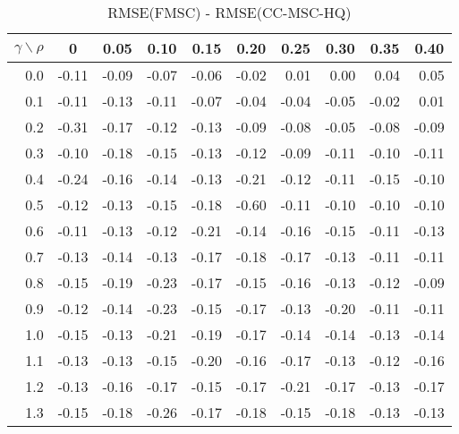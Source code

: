 \documentclass[12pt]{article}
\begin{document}
%
\begin{table}[!tbp]
\caption{RMSE(FMSC) - RMSE(CC-MSC-HQ)}
 \begin{center}
 \begin{tabular}{r|rrrrrrrrr}\hline\hline
\multicolumn{1}{c|}{$\gamma\backslash\rho$}&\multicolumn{1}{c}{0}&\multicolumn{1}{c}{0.05}&\multicolumn{1}{c}{0.10}&\multicolumn{1}{c}{0.15}&\multicolumn{1}{c}{0.20}&\multicolumn{1}{c}{0.25}&\multicolumn{1}{c}{0.30}&\multicolumn{1}{c}{0.35}&\multicolumn{1}{c}{0.40}\tabularnewline
\hline

0.0&-0.11&-0.09&-0.07&-0.06&-0.02& 0.01& 0.00& 0.04& 0.05\tabularnewline
0.1&-0.11&-0.13&-0.11&-0.07&-0.04&-0.04&-0.05&-0.02& 0.01\tabularnewline
0.2&-0.31&-0.17&-0.12&-0.13&-0.09&-0.08&-0.05&-0.08&-0.09\tabularnewline
0.3&-0.10&-0.18&-0.15&-0.13&-0.12&-0.09&-0.11&-0.10&-0.11\tabularnewline
0.4&-0.24&-0.16&-0.14&-0.13&-0.21&-0.12&-0.11&-0.15&-0.10\tabularnewline
0.5&-0.12&-0.13&-0.15&-0.18&-0.60&-0.11&-0.10&-0.10&-0.10\tabularnewline
0.6&-0.11&-0.13&-0.12&-0.21&-0.14&-0.16&-0.15&-0.11&-0.13\tabularnewline
0.7&-0.13&-0.14&-0.13&-0.17&-0.18&-0.17&-0.13&-0.11&-0.11\tabularnewline
0.8&-0.15&-0.19&-0.23&-0.17&-0.15&-0.16&-0.13&-0.12&-0.09\tabularnewline
0.9&-0.12&-0.14&-0.23&-0.15&-0.17&-0.13&-0.20&-0.11&-0.11\tabularnewline
1.0&-0.15&-0.13&-0.21&-0.19&-0.17&-0.14&-0.14&-0.13&-0.14\tabularnewline
1.1&-0.13&-0.13&-0.15&-0.20&-0.16&-0.17&-0.13&-0.12&-0.16\tabularnewline
1.2&-0.13&-0.16&-0.17&-0.15&-0.17&-0.21&-0.17&-0.13&-0.17\tabularnewline
1.3&-0.15&-0.18&-0.26&-0.17&-0.18&-0.15&-0.18&-0.13&-0.13\tabularnewline
\hline
\end{tabular}

\end{center}

\end{table}
\end{document}
